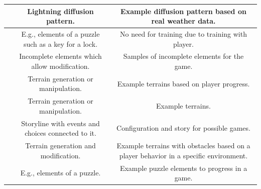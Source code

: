 \documentclass[MGS,Master,english]{twbook}%
\begin{document}
\begin{landscape}
\begin{table}[tp]
{\begin{tabular}{c|c|c|}
				\multicolumn{1}{|c||}{\nameref{idea::caughtInAThunderstorm}}  & Lightning diffusion pattern.                         & Example diffusion pattern based on real weather data.                                 \\ \hline
				\multicolumn{1}{|c||}{\nameref{idea::trainToProgress}}        & E.g., elements of a puzzle such as a key for a lock. & No need for training due to training with player.                                     \\ \hline
				\multicolumn{1}{|c||}{\nameref{idea::buildingWithAssistance}} & Incomplete elements which allow modification.        & Samples of incomplete elements for the game.                                          \\ \hline
				\multicolumn{1}{|c||}{\nameref{idea::exploringCoWorker}}      & Terrain generation or manipulation.                  & Example terrains based on player progress.                                            \\ \hline
				\multicolumn{1}{|c||}{\nameref{idea::observeAndLearn}}        & Terrain generation or manipulation.                  & Example terrains.                                                                     \\ \hline
				\multicolumn{1}{|c||}{\nameref{idea::expressYourself}}        & Storyline with events and choices connected to it.   & Configuration and story for possible games.                                           \\ \hline
				\multicolumn{1}{|c||}{\nameref{idea::bigBossHelper}}          & Terrain generation and modification.                 & Example terrains with obstacles based on a player behavior in a specific environment. \\ \hline
				\multicolumn{1}{|c||}{\nameref{idea::figureItOut}}            & E.g., elements of a puzzle.                          & Example puzzle elements to progress in a game.                                        \\ \hline
			\end{tabular}%
		}
	\end{table}
\end{landscape}
\end{document}
